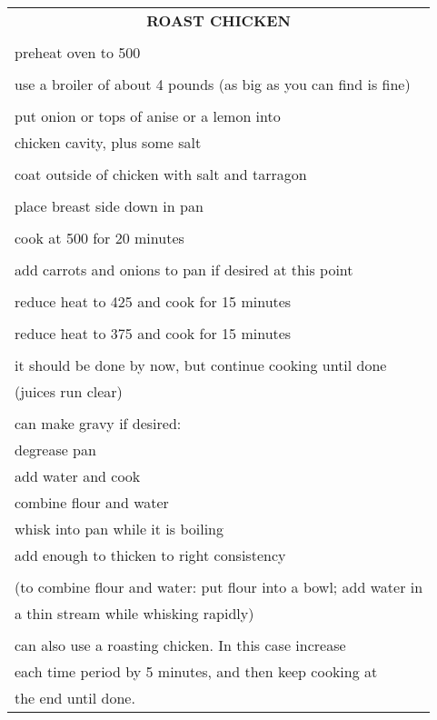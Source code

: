 \documentclass[8pt]{report}
\begin{document}
\centering

\begin{tabular}{|l|} \hline	%
 
\multicolumn{1}{|c|}{\bf ROAST CHICKEN}
\\
\\

\index{fish/meat!roast chicken} \index{roast chicken}
\index{chicken!roast}

preheat oven to 500\\
\\
use a broiler of about 4 pounds (as big as you can find is fine)\\
\\
put onion or tops of anise or a lemon into\\
chicken cavity, plus some salt\\
\\
coat outside of chicken with salt and tarragon\\
\\
place breast side down in pan\\
\\
cook at 500 for 20 minutes\\
\\
add carrots and onions to pan if desired at this point\\
\\
reduce heat to 425 and cook for 15 minutes\\
\\
reduce heat to 375 and cook for 15 minutes\\
\\
it should be done by now, but continue cooking until done\\
(juices run clear)\\
\\
can make gravy if desired:\\
\hspace{0.5 in}	degrease pan\\
\hspace{0.5 in}	add water and cook\\
\hspace{0.5 in}	combine flour and water\\
\hspace{0.5 in}	whisk into pan while it is boiling\\
\hspace{0.5 in}	add enough to thicken to right consistency\\
\\
(to combine flour and water:  put flour into a bowl; add water in\\
a thin stream while whisking rapidly)\\
\\
can also use a roasting chicken.  In this case increase\\
each time period by 5 minutes, and then keep cooking at\\
the end until done.\\ \hline


\end{tabular}
\end{document}
